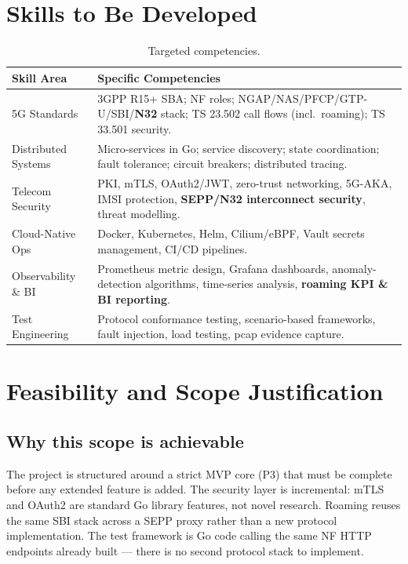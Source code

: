 \documentclass[11pt,a4paper]{report}
\begin{document}
\section{Skills to Be Developed}
\begin{table}[h]
\centering
\footnotesize
\renewcommand{\arraystretch}{1.25}
\begin{tabularx}{\linewidth}{@{}l X@{}}
\toprule
\textbf{Skill Area} & \textbf{Specific Competencies}\\
\midrule
5G Standards        & 3GPP R15+ SBA; NF roles; NGAP/NAS/PFCP/GTP-U/SBI/\textbf{N32} stack; TS 23.502 call flows (incl.\ roaming); TS 33.501 security.\\
Distributed Systems & Micro-services in Go; service discovery; state coordination; fault tolerance; circuit breakers; distributed tracing.\\
Telecom Security    & PKI, mTLS, OAuth2/JWT, zero-trust networking, 5G-AKA, IMSI protection, \textbf{SEPP/N32 interconnect security}, threat modelling.\\
Cloud-Native Ops    & Docker, Kubernetes, Helm, Cilium/eBPF, Vault secrets management, CI/CD pipelines.\\
Observability \& BI & Prometheus metric design, Grafana dashboards, anomaly-detection algorithms, time-series analysis, \textbf{roaming KPI \& BI reporting}.\\
Test Engineering    & Protocol conformance testing, scenario-based frameworks, fault injection, load testing, pcap evidence capture.\\
\bottomrule
\end{tabularx}
\caption{Targeted competencies.}
\label{tab:skills}
\end{table}

\section{Feasibility and Scope Justification}

\subsection{Why this scope is achievable}
The project is structured around a strict MVP core (P3) that must be complete before any
extended feature is added. The security layer is incremental: mTLS and OAuth2 are standard
Go library features, not novel research. Roaming reuses the same SBI stack across a SEPP
proxy rather than a new protocol implementation. The test framework is Go code calling the
same NF HTTP endpoints already built --- there is no second protocol stack to implement.
\end{document}
